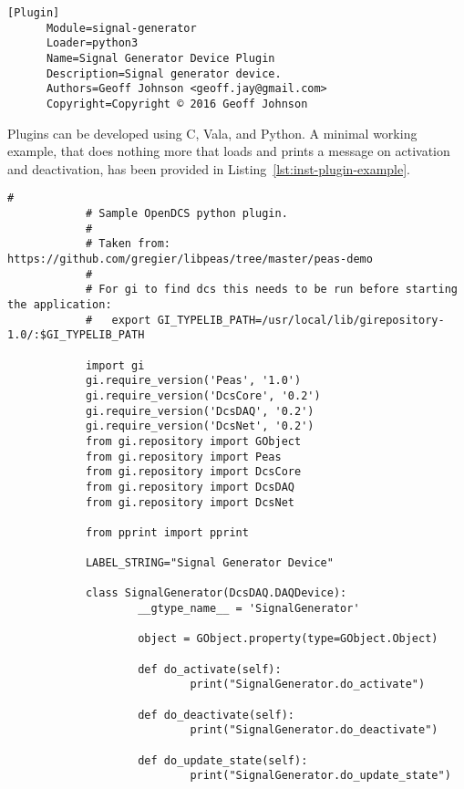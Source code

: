     \begin{lstlisting}[caption={Plugin Information File Example},
                       label={lst:inst-plugin-info}]
      [Plugin]
      Module=signal-generator
      Loader=python3
      Name=Signal Generator Device Plugin
      Description=Signal generator device.
      Authors=Geoff Johnson <geoff.jay@gmail.com>
      Copyright=Copyright © 2016 Geoff Johnson
    \end{lstlisting}

    Plugins can be developed using C, Vala, and Python. A minimal working
    example, that does nothing more that loads and prints a message on
    activation and deactivation, has been provided in
    Listing~\ref{lst:inst-plugin-example}.

    \begin{lstlisting}[caption={Minimal Working Example of a libpeas Plugin},
                       label={lst:inst-plugin-example}]
			#
			# Sample OpenDCS python plugin.
			#
			# Taken from: https://github.com/gregier/libpeas/tree/master/peas-demo
			#
			# For gi to find dcs this needs to be run before starting the application:
			#   export GI_TYPELIB_PATH=/usr/local/lib/girepository-1.0/:$GI_TYPELIB_PATH

			import gi
			gi.require_version('Peas', '1.0')
			gi.require_version('DcsCore', '0.2')
			gi.require_version('DcsDAQ', '0.2')
			gi.require_version('DcsNet', '0.2')
			from gi.repository import GObject
			from gi.repository import Peas
			from gi.repository import DcsCore
			from gi.repository import DcsDAQ
			from gi.repository import DcsNet

			from pprint import pprint

			LABEL_STRING="Signal Generator Device"

			class SignalGenerator(DcsDAQ.DAQDevice):
					__gtype_name__ = 'SignalGenerator'

					object = GObject.property(type=GObject.Object)

					def do_activate(self):
							print("SignalGenerator.do_activate")

					def do_deactivate(self):
							print("SignalGenerator.do_deactivate")

					def do_update_state(self):
							print("SignalGenerator.do_update_state")
    \end{lstlisting}
